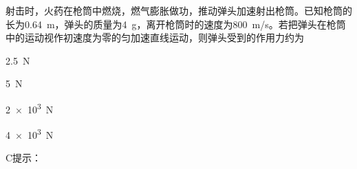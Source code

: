 射击时，火药在枪筒中燃烧，燃气膨胀做功，推动弹头加速射出枪筒。已知枪筒的长为\qty{0.64}{m}，弹头的质量为\qty{4}{g}，离开枪筒时的速度为\qty{800}{m/s}。若把弹头在枪筒中的运动视作初速度为零的匀加速直线运动，则弹头受到的作用力约为\paren[]
\begin{choices}
	\item \qty{2.5}{N}
	\item \qty{5}{N}
	\item \qty{2e3}{N}
	\item \qty{4e3}{N}
\end{choices}
\begin{answer}
    C\qquad 提示：
\end{answer}